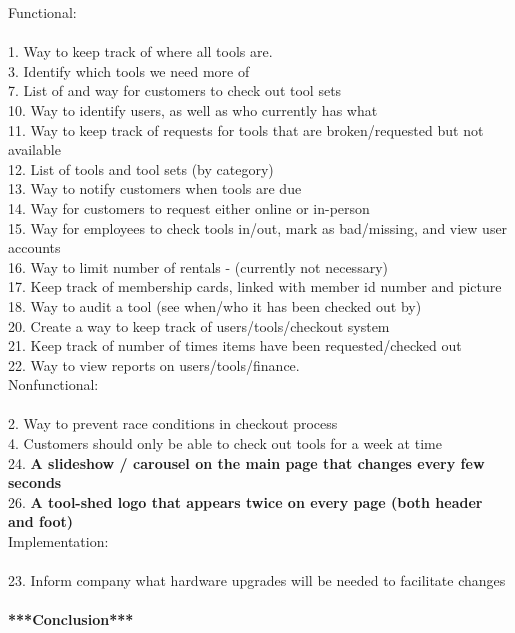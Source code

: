 \documentclass[12pt,letterpaper]{article}
\begin{document}
Functional:\\\\
1. Way to keep track of where all tools are.\\
3. Identify which tools we need more of\\
7. List of and way for customers to check out tool sets\\
10. Way to identify users, as well as who currently has what\\
11. Way to keep track of requests for tools that are broken/requested but not available\\
12. List of tools and tool sets (by category)\\
13. Way to notify customers when tools are due\\
14. Way for customers to request either online or in-person\\
15. Way for employees to check tools in/out, mark as bad/missing, and view user accounts\\
16. Way to limit number of rentals - (currently not necessary)\\
17. Keep track of membership cards, linked with member id number and picture\\
18. Way to audit a tool (see when/who it has been checked out by)\\
20. Create a way to keep track of users/tools/checkout system\\
21. Keep track of number of times items have been requested/checked out\\
22. Way to view reports on users/tools/finance.\\

Nonfunctional:\\\\
2. Way to prevent race conditions in checkout process\\
4. Customers should only be able to check out tools for a week at time\\
24. \textbf{A slideshow / carousel on the main page that changes every few seconds}\\
26. \textbf{A tool-shed logo that appears twice on every page (both header and foot)}\\

Implementation:\\\\
23. Inform company what hardware upgrades will be needed to facilitate changes\\\\

\textbf{***Conclusion***}
\end{document}
